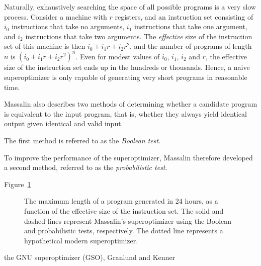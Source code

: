 \documentclass[a4paper,11pt]{kth-mag}
\begin{document}
Naturally, exhaustively searching the space of all possible programs is a very slow process.
Consider a machine with $r$ registers, and an instruction set consisting of $i_0$ instructions that take no arguments, $i_1$ instructions that take one argument, and $i_2$ instructions that take two arguments.
The \emph{effective} size of the instruction set of this machine is then $i_0+i_1r+i_2r^2$, and the number of programs of length $n$ is $(i_0+i_1r+i_2r^2)^n$.
Even for modest values of $i_0$, $i_1$, $i_2$ and $r$, the effective size of the instruction set ends up in the hundreds or thousands.
Hence, a naive superoptimizer is only capable of generating very short programs in reasonable time.


Massalin also describes two methods of determining whether a candidate program is equivalent to the input program, that is, whether they always yield identical output given identical and valid input.

The first method is referred to as the \emph{Boolean test}.

To improve the performance of the superoptimizer, Massalin therefore developed a second method, referred to as the \emph{probabilistic test}.

Figure~\ref{fig:so_program_length}

\begin{figure}
\centering

\caption{The maximum length of a program generated in 24 hours, as a function of the effective size of the instruction set.
The solid and dashed lines represent Massalin's superoptimizer using the Boolean and probabilistic tests, respectively.
The dotted line represents a hypothetical modern superoptimizer.}
\label{fig:so_program_length}
\end{figure}

the GNU superoptimizer (GSO), Granlund and Kenner \cite{granlund92}
\end{document}
